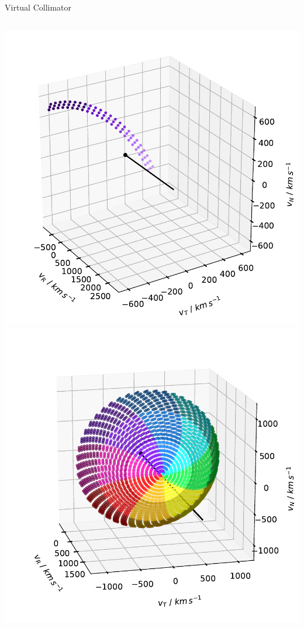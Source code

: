 \documentclass{beamer}
\begin{document}
\begin{frame}{Virtual Collimator}
	\begin{columns}
		\column[]{7cm}

		\includegraphics[scale=0.35]{Pics/coll_1sec.pdf}
		\column[]{7cm}
		\includegraphics[scale=0.35]{Pics/coll_allsec.pdf}
	\end{columns}
	
\end{frame}
\end{document}
